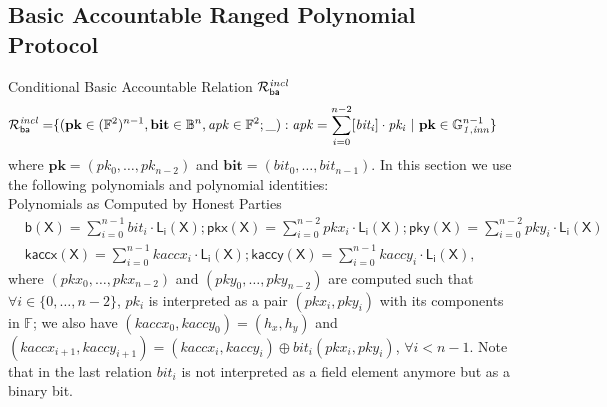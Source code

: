 \subsection{Basic Accountable Ranged Polynomial Protocol}
\label{sec_la}

\noindent \textsf{Conditional Basic Accountable Relation $\mathcal{R}^{\mathit{incl}}_{\mathsf{ba}}$}  
\begin{equation*}
\begin{split}
\mathcal{R}^{\mathit{incl}}_{\mathsf{ba}} = & \{(\mathbf{pk} \in ({\mathbb{F}^2})^{n-1}, \mathbf{bit} \in \mathbb{B}^n,
\mathit{apk} \in \mathbb{F}^2; \_) : \mathit{apk} = \sum_{i=0}^{n-2} [\mathit{bit_i}] \cdot \mathit{pk_i} \ | \ \mathbf{pk} \in \mathbb{G}_{\mathit{1,inn}}^{n-1} \} 
\end{split}
\end{equation*}
\noindent where $\mathbf{pk} = (\mathit{pk_0}, \ldots, \mathit{pk_{n-2}})$ and $\mathbf{bit} = (\mathit{bit_0}, \ldots, \mathit{bit_{n-1}})$. 
\noindent In this section we use the following polynomials and polynomial identities: \\

\noindent \textsf{Polynomials as Computed by Honest Parties} 
\begin{align*}
&\mathsf{b(X)} = \sum_{i=0}^{n-1} \mathit{bit_i} \cdot \mathsf{L_i(X)}; \mathsf{pkx(X)} =  \sum_{i=0}^{n-2} \mathit{pkx_i} \cdot \mathsf{L_i(X)}; \mathsf{pky(X)} =  \sum_{i=0}^{n-2} \mathit{pky_i} \cdot \mathsf{L_i(X)} \\
&\mathsf{kaccx(X)}  =  \sum_{i=0}^{n-1} \mathit{kaccx_i} \cdot \mathsf{L_i(X)}; \mathsf{kaccy(X)}  = \sum_{i=0}^{n-1} \mathit{kaccy_i} \cdot \mathsf{L_i(X)}, 
\end{align*}
\noindent where $(\mathit{pkx_0}, \ldots, \mathit{pkx_{n-2}})$ 
and $(\mathit{pky_0}, \ldots, \mathit{pky_{n-2}})$ are computed such that $\forall i \in \{0, \ldots, n-2\}$, $\mathit{pk_i}$ 
is interpreted as a pair $(\mathit{pkx_i}, \mathit{pky_i})$ with its components in $\mathbb{F}$; we also have 
$(\mathit{kaccx_{0}}, \mathit{kaccy_{0}}) = (\mathit{h_x}, \mathit{h_y})$ and 
$(\mathit{kaccx_{i+1}}, \mathit{kaccy_{i+1}}) =  (\mathit{kaccx_{i}}, \mathit{kaccy_{i}}) \oplus \mathit{bit_i}(\mathit{pkx_{i}}, \mathit{pky_{i}})$, 
$\forall i < n-1$. Note that in the last relation $\mathit{bit_i}$ is not interpreted as a field element anymore but as a binary bit.\\

